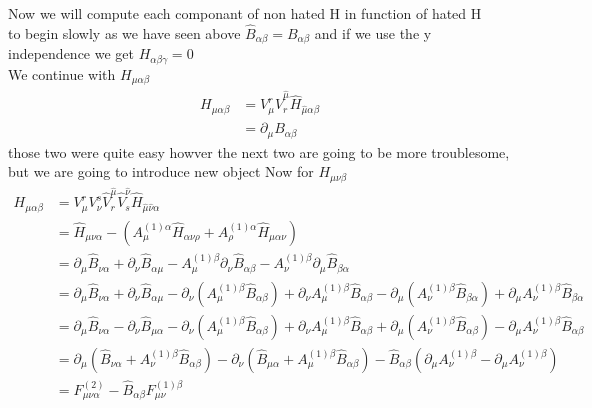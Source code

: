 \documentclass{article}
\begin{document}
Now we will compute each componant of non hated H in function of hated H\\
to begin slowly as we have seen above $\hat B_{\alpha \beta} = B_{\alpha \beta} $ and if we use the y independence we get $H_{\alpha \beta \gamma} = 0$\\
We continue with $H_{\mu \alpha \beta}$
\begin{equation}
    \begin{aligned}
        H_{\mu \alpha \beta} &= V^r_\mu  \hat V^{\hat \mu}_r \hat H_{\hat \mu \alpha \beta }\\
        & = \partial_\mu B_{\alpha \beta}
    \end{aligned}
\end{equation}
those two were quite easy howver the next two are going to be more troublesome, but we are going to introduce new object
Now for $H_{\mu \nu \beta}$
\begin{equation}
    \begin{aligned}
        H_{\mu \alpha \beta} &= V^r_\mu V^s_\nu \hat V^{\hat \mu}_r \hat V^{\hat \nu}_s \hat H_{\hat \mu \hat \nu \alpha}\\
        & = \hat H_{\mu \nu \alpha } -(A^{(1)\alpha}_\mu \hat H_{\alpha  \nu \rho}+A^{(1)\alpha}_\rho \hat H_{ \mu \alpha  \nu })\\
        &= \partial_\mu \hat B_{\nu \alpha} +\partial_\nu \hat B_{\alpha \mu}  -A^{(1)\beta}_\mu \partial_\nu \hat B_{\alpha \beta} -A^{(1)\beta}_\nu \partial_\mu \hat B_{\beta \alpha} \\
        &=  \partial_\mu \hat B_{\nu \alpha} +\partial_\nu \hat B_{\alpha \mu} -\partial_\nu  (A^{(1)\beta}_\mu \hat B_{\alpha \beta})+\partial_\nu A^{(1)\beta}_\mu  \hat B_{\alpha \beta}-\partial_\mu (A^{(1)\beta}_\nu \hat B_{\beta \alpha}) + \partial_\mu A^{(1)\beta}_\nu  \hat B_{\beta \alpha}\\
        &= \partial_\mu \hat B_{\nu \alpha} -\partial_\nu \hat B_{ \mu \alpha } -\partial_\nu  (A^{(1)\beta}_\mu \hat B_{\alpha \beta})+\partial_\nu A^{(1)\beta}_\mu  \hat B_{\alpha \beta}+\partial_\mu (A^{(1)\beta}_\nu \hat B_{ \alpha \beta}) - \partial_\mu A^{(1)\beta}_\nu  \hat B_{ \alpha \beta}\\
        &= \partial_\mu( \hat B_{\nu \alpha} + A^{(1)\beta}_\nu \hat B_{ \alpha \beta}) - \partial_\nu( \hat B_{ \mu \alpha } + A^{(1)\beta}_\mu \hat B_{\alpha \beta}) - \hat B_{\alpha \beta}(\partial_\mu A^{(1)\beta}_\nu-\partial_\mu A^{(1)\beta}_\nu)\\
        &= F^{(2)}_{\mu \nu \alpha } - \hat B_{ \alpha \beta }F^{(1)\beta}_{\mu \nu}
    \end{aligned}
\end{equation}
\end{document}
